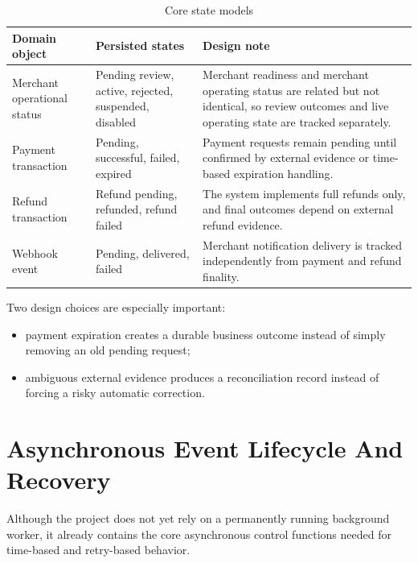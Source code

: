 \begin{table}[!htbp]
\centering
\caption{Core state models}
\begin{tabularx}{\textwidth}{L{0.24\textwidth}L{0.24\textwidth}Y}
\toprule
\textbf{Domain object} & \textbf{Persisted states} & \textbf{Design note} \\
\midrule
Merchant operational status & Pending review, active, rejected, suspended, disabled & Merchant readiness and merchant operating status are related but not identical, so review outcomes and live operating state are tracked separately. \\
\bodyrowrule
Payment transaction & Pending, successful, failed, expired & Payment requests remain pending until confirmed by external evidence or time-based expiration handling. \\
\bodyrowrule
Refund transaction & Refund pending, refunded, refund failed & The system implements full refunds only, and final outcomes depend on external refund evidence. \\
\bodyrowrule
Webhook event & Pending, delivered, failed & Merchant notification delivery is tracked independently from payment and refund finality. \\
\bottomrule
\end{tabularx}
\end{table}

Two design choices are especially important:

\begin{itemize}
  \item payment expiration creates a durable business outcome instead of simply
  removing an old pending request;
  \item ambiguous external evidence produces a reconciliation record instead of
  forcing a risky automatic correction.
\end{itemize}

\section{Asynchronous Event Lifecycle And Recovery}

Although the project does not yet rely on a permanently running background
worker, it already contains the core asynchronous control functions needed for
time-based and retry-based behavior.

